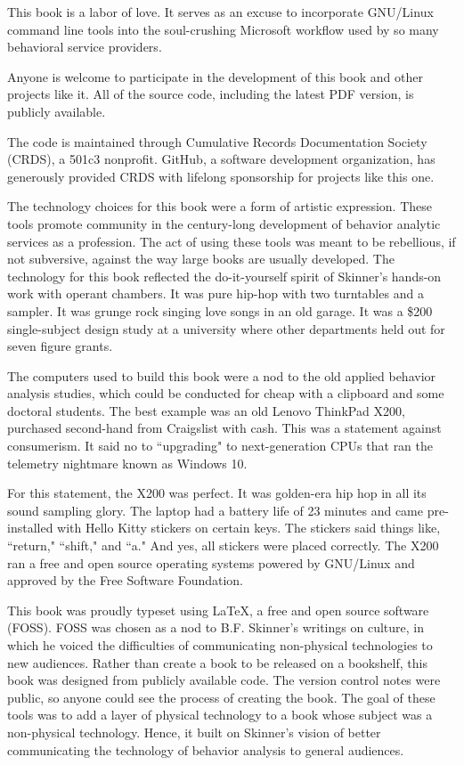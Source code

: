 This book is a labor of love. It serves as an excuse to incorporate GNU/Linux command line tools into the soul-crushing Microsoft workflow used by so many behavioral service providers. 

Anyone is welcome to participate in the development of this book and other projects like it. All of the source code, including the latest PDF version, is publicly available. 

The code is maintained through Cumulative Records Documentation Society (CRDS), a 501c3 nonprofit. GitHub, a software development organization, has generously provided CRDS with lifelong sponsorship for projects like this one.

The technology choices for this book were a form of artistic expression. These tools promote community in the century-long development of behavior analytic services as a profession. The act of using these tools was meant to be rebellious, if not subversive, against the way large books are usually developed. The technology  for this book reflected the do-it-yourself spirit of Skinner's hands-on work with operant chambers. It was pure hip-hop with two turntables and a sampler. It was grunge rock singing love songs in an old garage. It was a \$200 single-subject design study at a university where other departments held out for seven figure grants.

The computers used to build this book were a nod to the old applied behavior analysis studies, which could be conducted for cheap with a clipboard and some doctoral students. The best example was an old Lenovo ThinkPad X200, purchased second-hand from Craigslist with cash. This was a statement against consumerism. It said no to ``upgrading" to next-generation CPUs that ran the telemetry nightmare known as Windows 10.

For this statement, the X200 was perfect. It was golden-era hip hop in all its sound sampling glory. The laptop had a battery life of 23 minutes and came pre-installed with Hello Kitty stickers on certain keys. The stickers said things like, ``return," ``shift," and ``a." And yes, all stickers were placed correctly. The X200 ran a free and open source operating systems powered by GNU/Linux and approved by the Free Software Foundation.

This book was proudly typeset using \LaTeX, a free and open source software (FOSS). FOSS was chosen as a nod to B.F. Skinner's writings on culture, in which he voiced the difficulties of communicating non-physical technologies to new audiences. Rather than create a book to be released on a bookshelf, this book was designed from publicly available code. The version control notes were public, so anyone could see the process of creating the book. The goal of these tools was to add a layer of physical technology to a book whose subject was a non-physical technology. Hence, it built on Skinner's vision of better communicating the technology of behavior analysis to general audiences.

